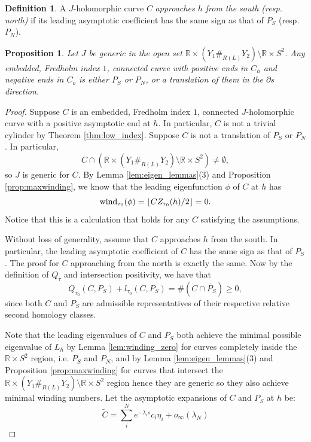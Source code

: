 \documentclass{article}
\numberwithin{equation}{section}
\newtheorem{proposition}[theorem]{Proposition}
\theoremstyle{definition}
\newtheorem{definition}[theorem]{Definition}
\newcommand{\R}{\mathbb{R}}
\newcommand{\wind}{\operatorname{wind}}
\DeclarePairedDelimiter{\floor}{\lfloor}{\rfloor}
\begin{document}
\begin{definition}
A $J$-holomorphic curve $C$ \emph{approaches $h$ from the south (resp. north)} if its leading asymptotic coefficient has the same sign as that of $P_S$ (resp. $P_N$). 
\end{definition}


\begin{proposition}
\label{prop:plane}
Let $J$ be generic in the open set $\mathbb{R}\times (Y_1\#_{R(L)}Y_2)\setminus \mathbb{R} \times S^2$. Any embedded, Fredholm index $1$, connected curve with positive ends in $C_h$ and negative ends in $C_o$ is either $P_S$ or $P_N$, or a translation of them in the $\partial s$ direction.
\end{proposition}
\begin{proof}
Suppose $C$ is an embedded, Fredholm index $1$, connected $J$-holomorphic curve with a positive asymptotic end at $h$. In particular, $C$ is not a trivial cylinder by Theorem \ref{thm:low_index}. Suppose $C$ is not a translation of $P_S$ or $P_N$. In particular, 
$$C \cap (\mathbb{R}\times (Y_1\#_{R(L)}Y_2)\setminus \mathbb{R} \times S^2) \neq \emptyset,$$
so $J$ is generic for $C$. By Lemma \ref{lem:eigen_lemmas}(3) and Proposition \ref{prop:maxwinding}, we know that the leading eigenfunction $\phi$ of $C$ at $h$ has
$$\wind_{\tau_0}(\phi) =\floor{CZ_{\tau_0}(h)/2} = 0.$$ 
Notice that this is a calculation that holds for any $C$ satisfying the assumptions.
 
Without loss of generality, assume that $C$ approaches $h$ from the south. In particular, the leading asymptotic coefficient of $C$ has the same sign as that of $P_S$. The proof for $C$ approaching from the north is exactly the same. Now by the definition of $Q_\tau$ and intersection positivity, we have that
\begin{equation}
\label{eq:Q_tau_link_tau}
    Q_{\tau_0}(C, P_S) + l_{\tau_0}(C, P_S) =  \#(\dot{C} \cap \dot{P_S}) \geq 0,
\end{equation}
since both $C$ and $P_S$ are admissible representatives of their respective relative second homology classes.
 

Note that the leading eigenvalues of $C$ and $P_S$ both achieve the minimal possible eigenvalue of $L_h$ by Lemma \ref{lem:winding_zero} for curves completely inside the $\R \times S^2$ region, i.e. $P_S$ and $P_N$, and by Lemma \ref{lem:eigen_lemmas}(3) and Proposition \ref{prop:maxwinding} for curves that intersect the $\R \times (Y_1 \#_{R(L)} Y_2) \setminus \R \times S^2$ region hence they are generic so they also achieve minimal winding numbers. Let the asymptotic expansions of $C$ and $P_S$ at $h$ be:
\begin{equation}
    \widetilde{C} = \sum_i^N e^{-\lambda_i s} c_i \eta_i +o_\infty(\lambda_N)
\end{equation}


\end{proof}
\end{document}
